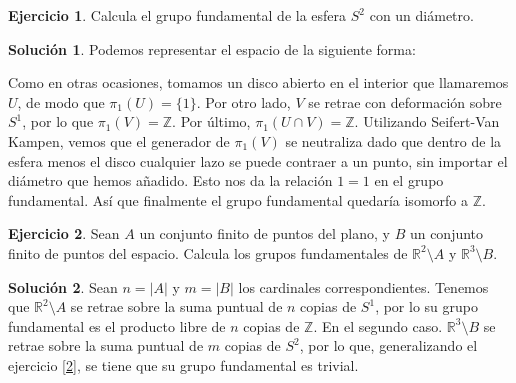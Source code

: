 \documentclass{article}
\theoremstyle{plain}
\theoremstyle{definition}
\newtheorem{exercise}{Ejercicio}
\newtheorem*{sol*}{Solución}
\newcommand{\Z}{\mathbb{Z}}
\begin{document}
\newpage

\begin{exercise}

Calcula el grupo fundamental de la esfera $S^2$ con un di\'ametro.

\end{exercise}
\begin{sol*} Podemos representar el espacio de la siguiente forma:\


Como en otras ocasiones, tomamos un disco abierto en el interior que llamaremos $U$, de modo que $\pi_1(U)=\{1\}$. Por otro lado, $V$ se retrae con deformación sobre $S^1$, por lo que $\pi_1(V)=\Z$. Por último, $\pi_1(U\cap V)=\Z$. Utilizando Seifert-Van Kampen, vemos que el generador de $\pi_1(V)$ se neutraliza dado que dentro de la esfera menos el disco cualquier lazo se puede contraer a un punto, sin importar el diámetro que hemos añadido. Esto nos da la relación $1=1$ en el grupo fundamental. Así que finalmente el grupo fundamental quedaría isomorfo a $\Z$. 
\end{sol*}

\newpage

\begin{exercise}

Sean $A$ un conjunto finito de puntos del plano, y $B$ un conjunto finito de puntos del espacio. Calcula los grupos fundamentales de $\mathbb{R}^2\setminus A$ y $\mathbb{R}^3\setminus B$.

\end{exercise}
\begin{sol*}
Sean $n=|A|$ y $m=|B|$ los cardinales correspondientes. Tenemos que $\mathbb{R}^2\setminus A$ se retrae sobre la suma puntual de $n$ copias de $S^1$, por lo su grupo fundamental es el producto libre de $n$ copias de $\Z$. En el segundo caso. $\mathbb{R}^3\setminus B$ se retrae sobre la suma puntual de $m$ copias de $S^2$, por lo que, generalizando el ejercicio \ref{2}, se tiene que su grupo fundamental es trivial.
\end{sol*}
\end{document}
